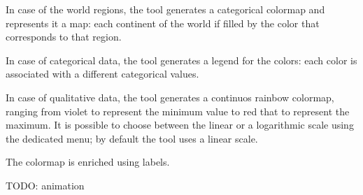 In case of the world regions, the tool generates a categorical colormap and represents it a map:
each continent of the world if filled by the color that corresponds to that region.

In case of categorical data, the tool generates a legend for the colors:
each color is associated with a different categorical values.


In case of qualitative data, the tool generates a continuos rainbow colormap, ranging from violet to represent the minimum value to red that to represent the maximum.
It is possible to choose between the linear or a logarithmic scale using the dedicated menu;
by default the tool uses a linear scale.

The colormap is enriched using labels.


TODO: animation
